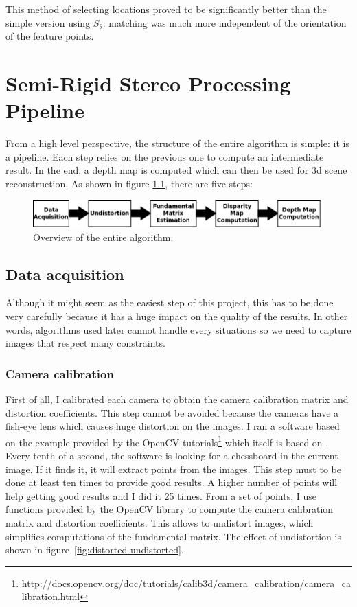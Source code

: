 \documentclass[11pt]{report}
\begin{document}
This method of selecting locations proved to be significantly better than the simple version using $S_\theta$: matching was much more independent of the orientation of the feature points.

\chapter{Semi-Rigid Stereo Processing Pipeline}

From a high level perspective, the structure of the entire algorithm is simple: it is a pipeline. Each step relies on the previous one to compute an intermediate result. In the end, a depth map is computed which can then be used for 3d scene reconstruction. As shown in figure \ref{fig:overview}, there are five steps:

\begin{figure}[H]
\centering
\includegraphics[scale=.3]{images/overview.png}
\caption{Overview of the entire algorithm.}
\label{fig:overview}
\end{figure}

\section{Data acquisition}

Although it might seem as the easiest step of this project, this has to be done very carefully because it has a huge impact on the quality of the results. In other words, algorithms used later cannot handle every situations so we need to capture images that respect many constraints. 

\subsection{Camera calibration}

First of all, I calibrated each camera to obtain the camera calibration matrix and distortion coefficients. This step cannot be avoided because the cameras have a fish-eye lens which causes huge distortion on the images.
I ran a software based on the example provided by the OpenCV tutorials\footnote{http://docs.opencv.org/doc/tutorials/calib3d/camera\_calibration/camera\_calibration.html} which itself is based on \cite{calib2000}. Every tenth of a second, the software is looking for a chessboard in the current image. If it finds it, it will extract points from the images. This step must to be done at least ten times to provide good results. A higher number of points will help getting good results and I did it 25 times. From a set of points, I use functions provided by the OpenCV library to compute the camera calibration matrix and distortion coefficients. This allows to undistort images, which simplifies computations of the fundamental matrix. The effect of undistortion is shown in figure~\ref{fig:distorted-undistorted}.
\end{document}
